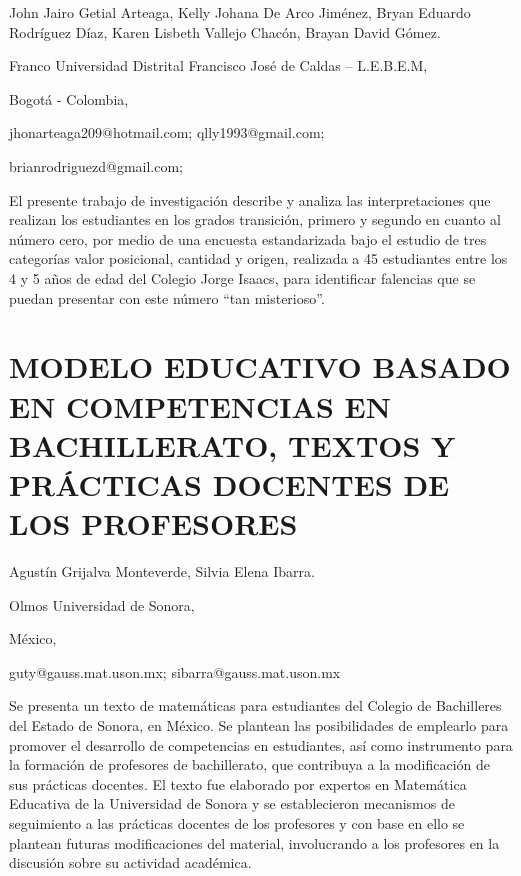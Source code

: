 \begin{datos}

John Jairo Getial Arteaga, Kelly Johana De Arco Jiménez, Bryan Eduardo
Rodríguez Díaz, Karen Lisbeth Vallejo Chacón, Brayan David Gómez.

Franco Universidad Distrital Francisco José de Caldas – L.E.B.E.M,

Bogotá - Colombia,

jhonarteaga209@hotmail.com; qlly1993@gmail.com;

brianrodriguezd@gmail.com; 

\end{datos}

El presente trabajo de investigación describe y analiza las interpretaciones
que realizan los estudiantes en los grados transición, primero y segundo
en cuanto al número cero, por medio de una encuesta estandarizada
bajo el estudio de tres categorías valor posicional, cantidad y origen,
realizada a 45 estudiantes entre los 4 y 5 años de edad del Colegio
Jorge Isaacs, para identificar falencias que se puedan presentar con
este número “tan misterioso”.


\section{MODELO EDUCATIVO BASADO EN COMPETENCIAS EN BACHILLERATO, TEXTOS Y
PRÁCTICAS DOCENTES DE LOS PROFESORES}

\begin{datos}

Agustín Grijalva Monteverde, Silvia Elena Ibarra.

Olmos Universidad de Sonora, 

México,

guty@gauss.mat.uson.mx; sibarra@gauss.mat.uson.mx 

\end{datos}

Se presenta un texto de matemáticas para estudiantes del Colegio de
Bachilleres del Estado de Sonora, en México. Se plantean las posibilidades
de emplearlo para promover el desarrollo de competencias en estudiantes,
así como instrumento para la formación de profesores de bachillerato,
que contribuya a la modificación de sus prácticas docentes. El texto
fue elaborado por expertos en Matemática Educativa de la Universidad
de Sonora y se establecieron mecanismos de seguimiento a las prácticas
docentes de los profesores y con base en ello se plantean futuras
modificaciones del material, involucrando a los profesores en la discusión
sobre su actividad académica.


